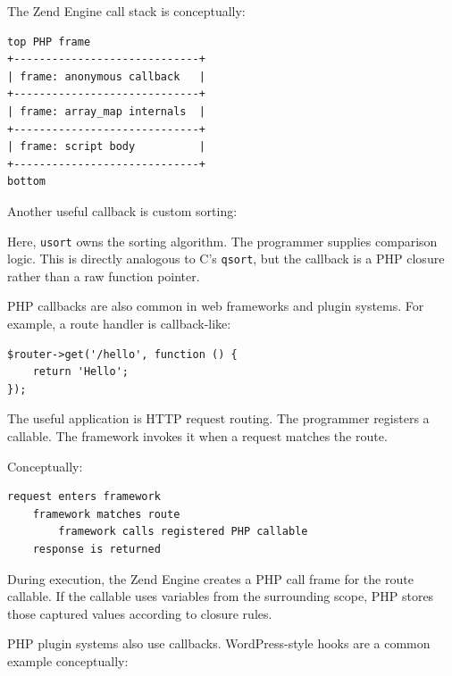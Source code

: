 The Zend Engine call stack is conceptually:

\begin{verbatim}
top PHP frame
+-----------------------------+
| frame: anonymous callback   |
+-----------------------------+
| frame: array_map internals  |
+-----------------------------+
| frame: script body          |
+-----------------------------+
bottom
\end{verbatim}

Another useful callback is custom sorting:



Here, \texttt{usort} owns the sorting algorithm. The programmer supplies comparison logic. This is directly analogous to C's \texttt{qsort}, but the callback is a PHP closure rather than a raw function pointer.

PHP callbacks are also common in web frameworks and plugin systems. For example, a route handler is callback-like:

\begin{verbatim}
$router->get('/hello', function () {
    return 'Hello';
});
\end{verbatim}

The useful application is HTTP request routing. The programmer registers a callable. The framework invokes it when a request matches the route.

Conceptually:

\begin{verbatim}
request enters framework
    framework matches route
        framework calls registered PHP callable
    response is returned
\end{verbatim}

During execution, the Zend Engine creates a PHP call frame for the route callable. If the callable uses variables from the surrounding scope, PHP stores those captured values according to closure rules.

PHP plugin systems also use callbacks. WordPress-style hooks are a common example conceptually:

